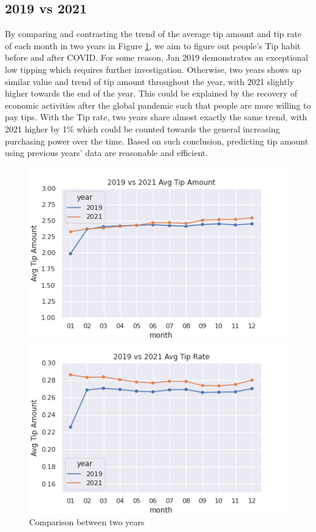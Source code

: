 \documentclass[11pt]{article}
\begin{document}
\subsection{2019 vs 2021}
By comparing and contrasting the trend of the average tip amount and tip rate of each month in two years in Figure \ref{fig:3}, we aim to figure out people's Tip habit before and after COVID. For some reason, Jan 2019 demonstrates an exceptional low tipping which requires further investigation. Otherwise, two years shows up similar value and trend of tip amount throughout the year, with 2021 slightly higher towards the end of the year. This could be explained by the recovery of economic activities after the global pandemic such that people are more willing to pay tips. With the Tip rate, two years share almost exactly the same trend, with 2021 higher by 1\% which could be counted towards the general increasing purchasing power over the time. Based on such conclusion, predicting tip amount using previous years' data are reasonable and efficient. 
\begin{figure}[h!]
   \begin{minipage}{0.48\textwidth}
     \centering
     \includegraphics[width=1\linewidth]{2019 vs 2021 Avg Tip Amount.png}
   \end{minipage}\hfill
   \begin{minipage}{0.48\textwidth}
     \centering
     \includegraphics[width=1\linewidth]{2019 vs 2021 Avg Tip Rate.png}
   \end{minipage}
   \caption{Comparison between two years}
   \label{fig:3}
\end{figure}
\end{document}
